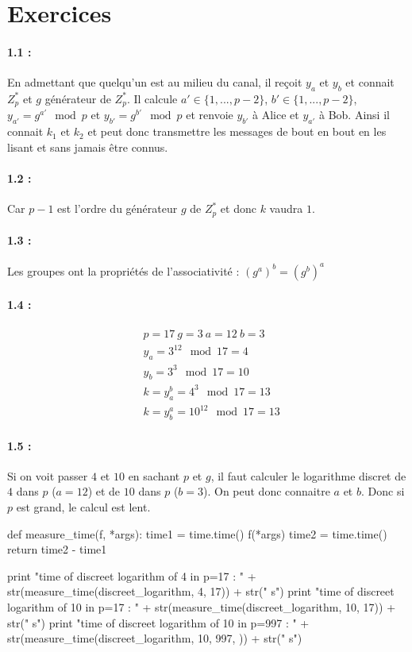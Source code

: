 \documentclass[11pt,a4paper]{report}
\begin{document}
\section{Exercices}

\paragraph*{1.1 : } En admettant que quelqu'un est au milieu du canal, il reçoit $y_a$ et $y_b$ et connait $Z^*_p$ et $g$ générateur de $Z^*_p$. Il calcule $a' \in \{1,...,p-2\}$, $b' \in \{1,...,p-2\}$, $y_{a'} = g^{a'} \mod p$ et $y_{b'}=g^{b'} \mod p$ et renvoie $y_{b'}$ à Alice et $y_{a'}$ à Bob. Ainsi il connait $k_1$ et $k_2$ et peut donc transmettre les messages de bout en bout en les lisant et sans jamais être connus.

\paragraph*{1.2 : } Car $p-1$ est l'ordre du générateur $g$ de $Z^*_p$ et donc $k$ vaudra $1$.

\paragraph*{1.3 : } Les groupes ont la propriétés de l'associativité : $(g^a)^b = (g^b)^a$

\paragraph*{1.4 : }
\begin{align*}
& p = 17 \ g=3 \ a=12 \ b=3 \\
&y_a = 3^{12} \mod 17 = 4\\
&y_b = 3^3 \mod 17 = 10\\
&k = y_a^b = 4^3 \mod 17 = 13\\
&k = y_b^a = 10^{12} \mod 17 = 13
\end{align*}

\paragraph*{1.5 : } Si on voit passer $4$ et $10$ en sachant $p$ et $g$, il faut calculer le logarithme discret de $4$ dans $p$ ($a=12$) et de $10$ dans $p$ ($b=3$). On peut donc connaitre $a$ et $b$. Donc si $p$ est grand, le calcul est lent.

\begin{pythoncode}
def measure_time(f, *args):
    time1 = time.time()
    f(*args)
    time2 = time.time()
    return time2 - time1
    
print "time of discreet logarithm of 4 in p=17 : " 
      + str(measure_time(discreet_logarithm, 4, 17)) + str(" s")
print "time of discreet logarithm of 10 in p=17 : " 
      + str(measure_time(discreet_logarithm, 10, 17)) + str(" s")
print "time of discreet logarithm of 10 in p=997 : " 
      + str(measure_time(discreet_logarithm, 10, 997, )) + str(" s")
\end{pythoncode}
\end{document}
